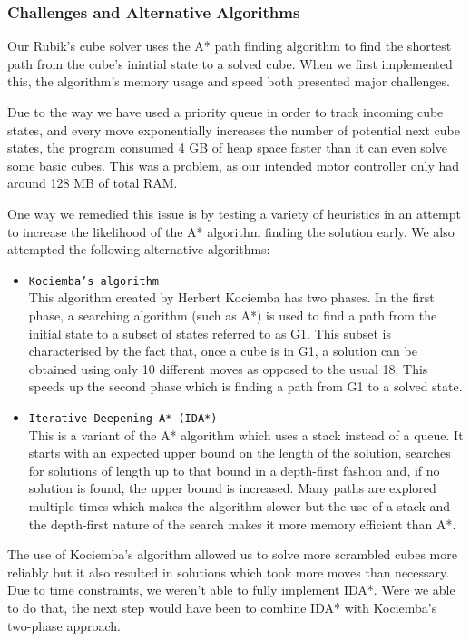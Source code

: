 \documentclass[8pt]{article}
\begin{document}
\subsubsection{Challenges and Alternative Algorithms}

Our Rubik's cube solver uses the A* path finding algorithm to find the shortest path
from the cube's inintial state to a solved cube. When we first implemented this,
the algorithm's memory usage and speed both presented major challenges.

Due to the way we have used a priority queue in order to track incoming cube states,
and every move exponentially increases the number of potential next cube states, the
program consumed 4 GB of heap space faster than it can even solve some basic cubes.
This was a problem, as our intended motor controller only had around 128 MB of total RAM.

One way we remedied this issue is by testing a variety of heuristics in an attempt to
increase the likelihood of the A* algorithm finding the solution early. We also attempted
the following alternative algorithms:
\begin{itemize}
    \item \texttt{Kociemba's algorithm} \\ This algorithm created by Herbert Kociemba
    has two phases. In the first phase, a searching algorithm (such as A*)
    is used to find a path from the initial state to a subset of states referred to as G1.
    This subset is characterised by the fact that, once a cube is in G1, a solution can
    be obtained using only 10 different moves as opposed to the usual 18. This speeds up
    the second phase which is finding a path from G1 to a solved state.
    \item \texttt{Iterative Deepening A* (IDA*)} \\ This is a variant of the A* algorithm
    which uses a stack instead of a queue. It starts with an expected upper bound on
    the length of the solution, searches for solutions of length up to that bound in a
    depth-first fashion and, if no solution is found, the upper bound is increased.
    Many paths are explored multiple times which makes the algorithm slower but the use
    of a stack and the depth-first nature of the search makes it more memory efficient than A*.
\end{itemize}

The use of Kociemba's algorithm allowed us to solve more scrambled cubes more reliably but
it also resulted in solutions which took more moves than necessary. Due to time constraints,
we weren't able to fully implement IDA*. Were we able to do that, the next step would have been
to combine IDA* with Kociemba's two-phase approach.
\end{document}
